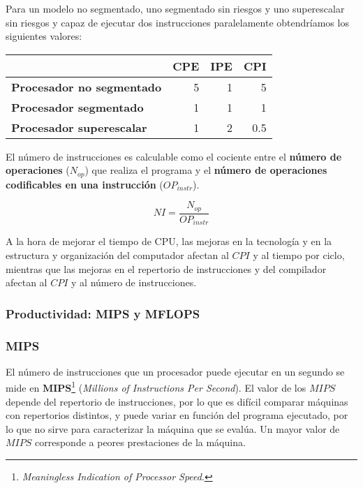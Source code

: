 Para un modelo no segmentado, uno segmentado sin riesgos y uno superescalar sin riesgos y capaz de ejecutar dos instrucciones paralelamente obtendríamos los siguientes valores:

\begin{center}
\begin{tabular}{l r r r}
	                                  & \textbf{CPE} & \textbf{IPE} & \textbf{CPI} \\
	\toprule
	\textbf{Procesador no segmentado} & 5            & 1            & 5 \\
	\textbf{Procesador segmentado}    & 1            & 1            & 1 \\
	\textbf{Procesador superescalar}  & 1            & 2            & 0.5 \\
\end{tabular}
\end{center}

El número de instrucciones es calculable como el cociente entre el \textbf{número de operaciones} ($N_{op}$) que realiza el programa y el \textbf{número de operaciones codificables en una instrucción} ($OP_{instr}$).

\[NI=\frac{N_{op}}{OP_{instr}}\]

A la hora de mejorar el tiempo de CPU, las mejoras en la tecnología y en la estructura y organización del computador afectan al $CPI$ y al tiempo por ciclo, mientras que las mejoras en el repertorio de instrucciones y del compilador afectan al $CPI$ y al número de instrucciones.

\subsubsection{Productividad: MIPS y MFLOPS}

\subsubsection{MIPS}

El número de instrucciones que un procesador puede ejecutar en un segundo se mide en $\boldsymbol{MIPS}$\footnote{\textit{Meaningless Indication of Processor Speed}.} (\textit{Millions of Instructions Per Second}).
El valor de los $MIPS$ depende del repertorio de instrucciones, por lo que es difícil comparar máquinas con repertorios distintos, y puede variar en función del programa ejecutado, por lo que no sirve para caracterizar la máquina que se evalúa.
Un mayor valor de $MIPS$ corresponde a peores prestaciones de la máquina.

